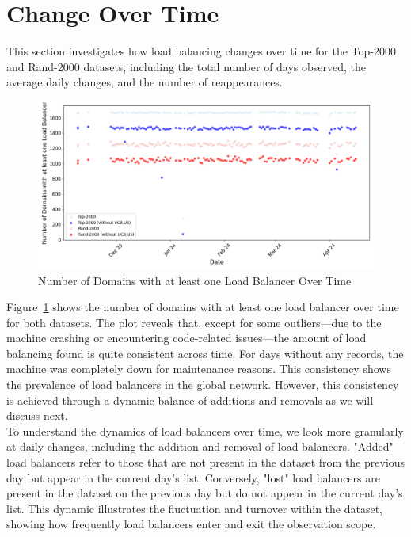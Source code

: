 \documentclass[12pt]{cwru_thesis}
\begin{document}
\newpage
\section{Change Over Time}

This section investigates how load balancing changes over time for the Top-2000 and Rand-2000 datasets, including the total number of days observed, the average daily changes, and the number of reappearances. 

\begin{figure}[h!]
\centering
\includegraphics[width=\textwidth]{figures/scatter_plot_domains.png}
\caption{Number of Domains with at least one Load Balancer Over Time}
\label{fig:stat_plot}
\end{figure}

Figure~\ref{fig:stat_plot} shows the number of domains with at least one load balancer over time for both datasets. The plot reveals that, except for some outliers—due to the machine crashing or encountering code-related issues—the amount of load balancing found is quite consistent across time. For days without any records, the machine was completely down for maintenance reasons. This consistency shows the prevalence of load balancers in the global network. However, this consistency is achieved through a dynamic balance of additions and removals as we will discuss next.\\

To understand the dynamics of load balancers over time, we look more granularly at daily changes, including the addition and removal of load balancers. "Added" load balancers refer to those that are not present in the dataset from the previous day but appear in the current day's list. Conversely, "lost" load balancers are present in the dataset on the previous day but do not appear in the current day's list. This dynamic illustrates the fluctuation and turnover within the dataset, showing how frequently load balancers enter and exit the observation scope.
\end{document}
